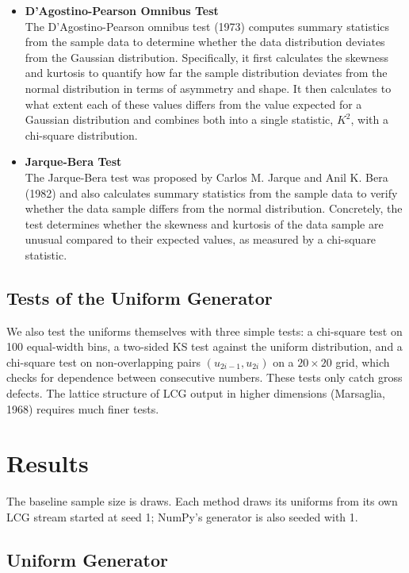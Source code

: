 \documentclass[12pt,a4paper]{article}
\newcommand{\head}[1]{\textbf{#1}\\}
\begin{document}
\begin{itemize}
\item \head{D'Agostino-Pearson Omnibus Test}
The D'Agostino-Pearson omnibus test (1973) computes summary statistics from the sample data to determine whether the data distribution deviates from the Gaussian distribution. Specifically, it first calculates the skewness and kurtosis to quantify how far the sample distribution deviates from the normal distribution in terms of asymmetry and shape. It then calculates to what extent each of these values differs from the value expected for a Gaussian distribution and combines both into a single statistic, $K^2$, with a chi-square distribution.
\item \head{Jarque-Bera Test}
The Jarque-Bera test was proposed by Carlos M. Jarque and Anil K. Bera (1982) and also calculates summary statistics from the sample data to verify whether the data sample differs from the normal distribution. Concretely, the test determines whether the skewness and kurtosis of the data sample are unusual compared to their expected values, as measured by a chi-square statistic.
\end{itemize}

\subsection{Tests of the Uniform Generator}

We also test the uniforms themselves with three simple tests: a chi-square test on 100 equal-width bins, a two-sided KS test against the uniform distribution, and a chi-square test on non-overlapping pairs $(u_{2i-1}, u_{2i})$ on a $20 \times 20$ grid, which checks for dependence between consecutive numbers. These tests only catch gross defects. The lattice structure of LCG output in higher dimensions (Marsaglia, 1968) requires much finer tests.

\section{Results}

The baseline sample size is \SampleSize{} draws. Each method draws its uniforms from its own LCG stream started at seed 1; NumPy's generator is also seeded with 1.

\subsection{Uniform Generator}
\end{document}
